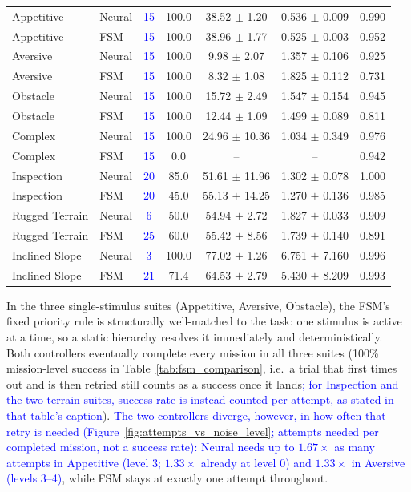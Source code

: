 \documentclass[preprint,12pt]{elsarticle}
\newcommand{\revblue}[1]{\textcolor{blue}{#1}}
\begin{document}
\begin{table}[htbp]
\begin{tabular}{l l c c c c c}
\midrule
Appetitive & Neural & \revblue{15} & 100.0  & 38.52 $\pm$ 1.20  & 0.536 $\pm$ 0.009 & 0.990 \\
Appetitive & FSM    & \revblue{15} & 100.0 & 38.96 $\pm$ 1.77  & 0.525 $\pm$ 0.003 & 0.952 \\
Aversive   & Neural & \revblue{15} & 100.0  & 9.98 $\pm$ 2.07   & 1.357 $\pm$ 0.106 & 0.925 \\
Aversive   & FSM    & \revblue{15} & 100.0 & 8.32 $\pm$ 1.08   & 1.825 $\pm$ 0.112 & 0.731 \\
Obstacle   & Neural & \revblue{15} & 100.0 & 15.72 $\pm$ 2.49  & 1.547 $\pm$ 0.154 & 0.945 \\
Obstacle   & FSM    & \revblue{15} & 100.0 & 12.44 $\pm$ 1.09  & 1.499 $\pm$ 0.089 & 0.811 \\
Complex    & Neural & \revblue{15} & 100.0 & 24.96 $\pm$ 10.36 & 1.034 $\pm$ 0.349 & 0.976 \\
Complex    & FSM    & \revblue{15} & 0.0   & --                & --                & 0.942 \\
Inspection & Neural & \revblue{20} & 85.0  & 51.61 $\pm$ 11.96 & 1.302 $\pm$ 0.078 & 1.000 \\
Inspection & FSM    & \revblue{20} & 45.0  & 55.13 $\pm$ 14.25 & 1.270 $\pm$ 0.136 & 0.985 \\
Rugged Terrain & Neural & \revblue{6} & 50.0  & 54.94 $\pm$ 2.72  & 1.827 $\pm$ 0.033 & 0.909 \\
Rugged Terrain & FSM    & \revblue{25} & 60.0  & 55.42 $\pm$ 8.56  & 1.739 $\pm$ 0.140 & 0.891 \\
Inclined Slope & Neural & \revblue{3} & 100.0 & 77.02 $\pm$ 1.26  & 6.751 $\pm$ 7.160 & 0.996 \\
Inclined Slope & FSM    & \revblue{21} & 71.4  & 64.53 $\pm$ 2.79  & 5.430 $\pm$ 8.209 & 0.993 \\
\bottomrule
\end{tabular}
\end{table}

In the three single-stimulus suites (Appetitive, Aversive, Obstacle), the FSM's fixed priority rule is structurally well-matched to the task: one stimulus is active at a time, so a static hierarchy resolves it immediately and deterministically. Both controllers eventually complete every mission in all three suites (100\% mission-level success in Table~\ref{tab:fsm_comparison}, i.e.\ a trial that first times out and is then retried still counts as a success once it lands\revblue{; for Inspection and the two terrain suites, success rate is instead counted per attempt, as stated in that table's caption}). \revblue{The two controllers diverge, however, in how often that retry is needed (Figure~\ref{fig:attempts_vs_noise_level}; attempts needed per completed mission, not a success rate):} \revblue{Neural needs up to $1.67\times$ as many attempts in Appetitive (level 3; $1.33\times$ already at level 0) and $1.33\times$ in Aversive (levels 3--4)}, while FSM stays at exactly one attempt throughout.
\end{document}
